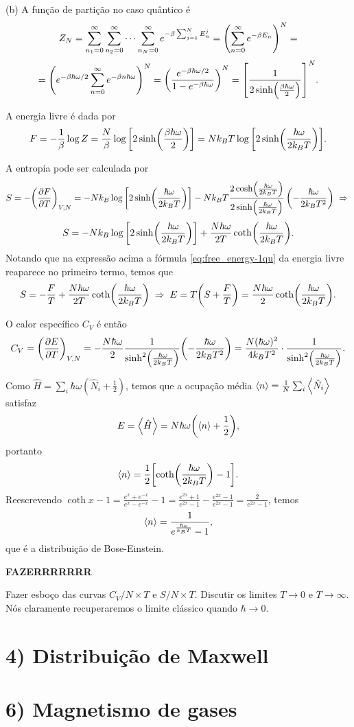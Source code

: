 \documentclass[a4paper,10pt]{article}
\begin{document}
(b) A função de partição no caso quântico é
$$
Z_N = \sum_{n_1 = 0}^{\infty} \sum_{n_2 = 0}^{\infty} \cdots \sum_{n_N = 0}^{\infty} e^{-\beta \sum_{j=1}^{N} E_n^j} =
\qty(\sum_{n=0}^{\infty} e^{-\beta E_n})^N =
$$
$$
= \qty(e^{-\beta \hbar \omega / 2} \sum_{n=0}^{\infty} e^{-\beta n \hbar\omega})^N =
\qty(\frac{e^{-\beta \hbar \omega / 2}}{1 - e^{-\beta\hbar\omega}})^N =
\qty[\frac{1}{2\sinh(\frac{\beta\hbar\omega}{2})}]^N.
$$

A energia livre é dada por
\begin{equation} \label{eq:free_energy-1qu}
F = - \frac{1}{\beta} \log Z = \frac{N}{\beta} \log\qty[2 \sinh(\frac{\beta\hbar\omega}{2})] =
N k_B T \log\qty[2 \sinh(\frac{\hbar\omega}{2 k_B T})].
\end{equation}

A entropia pode ser calculada por
$$
S = -\qty(\pdv{F}{T})_{V,N} = - N k_B \log\qty[2 \sinh(\frac{\hbar\omega}{2 k_B T})] -
N k_B T \frac{2 \cosh(\frac{\hbar\omega}{2 k_B T})}{2 \sinh(\frac{\hbar\omega}{2 k_B T})} \,
\qty(-\frac{\hbar\omega}{2 k_B T^2}) \; \Rightarrow \;
$$
$$
S = - N k_B \log\qty[2 \sinh(\frac{\hbar\omega}{2 k_B T})] + \frac{N\hbar\omega}{2 T} \coth(\frac{\hbar\omega}{2 k_B T}).
$$
Notando que na expressão acima a fórmula \ref{eq:free_energy-1qu} da energia livre reaparece no primeiro termo, temos que
$$
S = - \frac{F}{T} + \frac{N\hbar\omega}{2 T} \coth(\frac{\hbar\omega}{2 k_B T}) \; \Rightarrow \;
E = T \qty(S + \frac{F}{T}) = \frac{N\hbar\omega}{2} \coth(\frac{\hbar\omega}{2 k_B T}).
$$

O calor específico $C_V$ é então
$$
C_V = \qty(\pdv{E}{T})_{V,N} =
- \frac{N\hbar\omega}{2} \frac{1}{\sinh[2](\frac{\hbar\omega}{2 k_B T})} \qty(-\frac{\hbar\omega}{2 k_B T^2}) =
\frac{N (\hbar\omega)^2}{4 k_B T^2} \cdot \frac{1}{\sinh[2](\frac{\hbar\omega}{2 k_B T})}.
$$

\n

Como $\hat{H} = \sum_{i} \hbar\omega(\hat{N}_i + \frac{1}{2})$, temos que a ocupação média $\ev{n} = \frac{1}{N} \sum_{i} \ev{\hat{N}_i}$ satisfaz
$$
E = \ev{\hat{H}} = N \hbar\omega\qty(\ev{n} + \frac{1}{2}),
$$
portanto
$$
\ev{n} = \frac{1}{2} \qty[\coth(\frac{\hbar\omega}{2 k_B T}) - 1].
$$
Reescrevendo $\coth x - 1 = \frac{e^x + e^{-x}}{e^x - e^{-x}} - 1 = \frac{e^{2x} + 1}{e^{2x} - 1} - \frac{e^{2x} - 1}{e^{2x} - 1} = \frac{2}{e^{2x} - 1}$, temos
$$
\ev{n} = \frac{1}{e^{\frac{\hbar\omega}{k_B T}} - 1},
$$
que é a distribuição de Bose-Einstein.

\n

\textbf{FAZERRRRRRR}

Fazer esboço das curvas $C_V/N \times T$ e $S/N \times T$. Discutir os limites $T \to 0$ e $T \to \infty$. Nós claramente recuperaremos o limite clássico quando $\hbar \to 0$.



\pagebreak

\section*{4) Distribuição de Maxwell}

\pagebreak

\section*{6) Magnetismo de gases}
\end{document}

